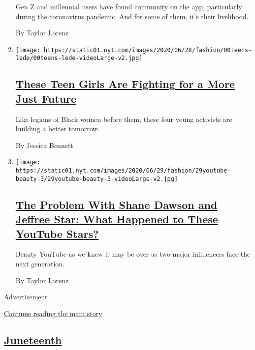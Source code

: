 \begin{enumerate}
  Gen Z and millennial users have found community on the app,
  particularly during the coronavirus pandemic. And for some of them,
  it's their livelihood.

  By Taylor Lorenz
\item
  \texttt{[image: https://static01.nyt.com/images/2020/06/28/fashion/00teens-lede/00teens-lede-videoLarge-v2.jpg]}

  \hypertarget{these-teen-girls-are-fighting-for-a-more-just-future}{%
  \subsection{\texorpdfstring{\href{/2020/06/26/style/teen-girls-black-lives-matter-activism.html}{These
  Teen Girls Are Fighting for a More Just
  Future}}{These Teen Girls Are Fighting for a More Just Future}}\label{these-teen-girls-are-fighting-for-a-more-just-future}}

  Like legions of Black women before them, these four young activists
  are building a better tomorrow.

  By Jessica Bennett
\item
  \texttt{[image: https://static01.nyt.com/images/2020/06/29/fashion/29youtube-beauty-3/29youtube-beauty-3-videoLarge-v2.jpg]}

  \hypertarget{the-problem-with-shane-dawson-and-jeffree-star-what-happened-to-these-youtube-stars}{%
  \subsection{\texorpdfstring{\href{/2020/06/29/style/shane-dawson-jeffree-star-youtube-taylor-lorenz.html}{The
  Problem With Shane Dawson and Jeffree Star: What Happened to These
  YouTube
  Stars?}}{The Problem With Shane Dawson and Jeffree Star: What Happened to These YouTube Stars?}}\label{the-problem-with-shane-dawson-and-jeffree-star-what-happened-to-these-youtube-stars}}

  Beauty YouTube as we knew it may be over as two major influencers face
  the next generation.

  By Taylor Lorenz
\end{enumerate}

Advertisement

\protect\hyperlink{after-mid1}{Continue reading the main story}

\hypertarget{juneteenth}{%
\subsection{\texorpdfstring{\href{/issue/style/2020/06/18/juneteenth}{Juneteenth}}{Juneteenth}}\label{juneteenth}}

